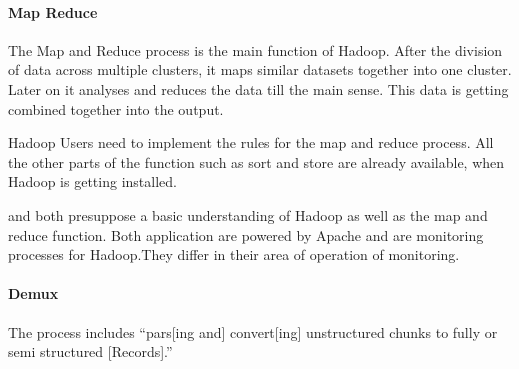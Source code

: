 \paragraph{Map Reduce}
The Map and Reduce process is the main function of Hadoop. After the division of data across multiple clusters, it maps similar datasets together into one cluster. 
Later on it analyses and reduces the data till the main sense. This data is getting combined together into the output. \cite{Dagli2014}

Hadoop Users need to implement the rules for the map and reduce process. All the other parts of the function such as sort and store are already available, when Hadoop is getting installed.\cite{Dagli2014}


\amb and \chuk both presuppose a basic understanding of Hadoop as well as the map and reduce function. Both application are powered by Apache and are monitoring processes for Hadoop.They differ in their area of operation of monitoring.\cite{ApacheSoftwareFoundation2015}

\paragraph{Demux}
The \demux process includes ``pars[ing and]  convert[ing]  unstructured  chunks  to  fully  or  semi  structured [Records].''~\cite{Boulon}